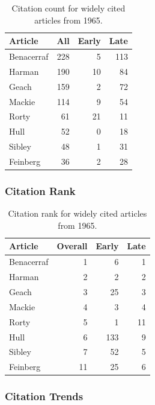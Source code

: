 \documentclass[
  10pt,
  letterpaper,
  DIV=11,
  numbers=noendperiod,
  twoside]{scrartcl}
\begin{document}
\begin{longtable}[]{@{}lrrr@{}}

\caption{\label{tbl-citation-count-1965}Citation count for widely cited
articles from 1965.}

\tabularnewline

\toprule\noalign{}
Article & All & Early & Late \\
\midrule\noalign{}
\endhead
\bottomrule\noalign{}
\endlastfoot
Benacerraf & 228 & 5 & 113 \\
Harman & 190 & 10 & 84 \\
Geach & 159 & 2 & 72 \\
Mackie & 114 & 9 & 54 \\
Rorty & 61 & 21 & 11 \\
Hull & 52 & 0 & 18 \\
Sibley & 48 & 1 & 31 \\
Feinberg & 36 & 2 & 28 \\

\end{longtable}

\subsubsection*{Citation Rank}\label{sec-rank-1965}

\begin{longtable}[]{@{}lrrr@{}}

\caption{\label{tbl-citation-rank-1965}Citation rank for widely cited
articles from 1965.}

\tabularnewline

\toprule\noalign{}
Article & Overall & Early & Late \\
\midrule\noalign{}
\endhead
\bottomrule\noalign{}
\endlastfoot
Benacerraf & 1 & 6 & 1 \\
Harman & 2 & 2 & 2 \\
Geach & 3 & 25 & 3 \\
Mackie & 4 & 3 & 4 \\
Rorty & 5 & 1 & 11 \\
Hull & 6 & 133 & 9 \\
Sibley & 7 & 52 & 5 \\
Feinberg & 11 & 25 & 6 \\

\end{longtable}

\subsubsection*{Citation Trends}\label{sec-trends-1965}
\end{document}
